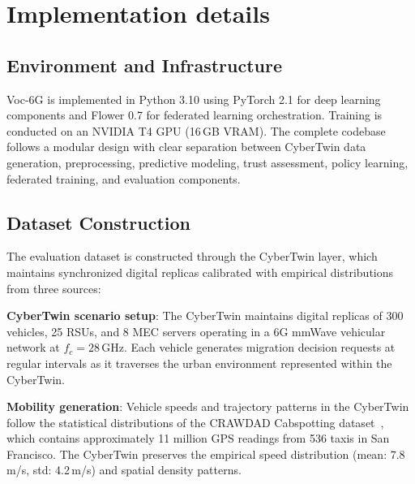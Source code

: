 \documentclass[10pt,letterpaper]{article}
\providecommand{\VocSixG}{Voc-6G}
\begin{document}
\section*{Implementation details}
\label{sec:implementation}

\subsection*{Environment and Infrastructure}

\VocSixG{} is implemented in Python 3.10 using PyTorch 2.1 for deep learning components and Flower 0.7 for federated learning orchestration. Training is conducted on an NVIDIA T4 GPU (16\,GB VRAM). The complete codebase follows a modular design with clear separation between CyberTwin data generation, preprocessing, predictive modeling, trust assessment, policy learning, federated training, and evaluation components.

\subsection*{Dataset Construction}

The evaluation dataset is constructed through the CyberTwin layer, which maintains synchronized digital replicas calibrated with empirical distributions from three sources:

\textbf{CyberTwin scenario setup}: The CyberTwin maintains digital replicas of 300 vehicles, 25 RSUs, and 8 MEC servers operating in a 6G mmWave vehicular network at $f_c = 28$\,GHz. Each vehicle generates migration decision requests at regular intervals as it traverses the urban environment represented within the CyberTwin.

\textbf{Mobility generation}: Vehicle speeds and trajectory patterns in the CyberTwin follow the statistical distributions of the CRAWDAD Cabspotting dataset~\cite{crawdad2009}, which contains approximately 11 million GPS readings from 536 taxis in San Francisco. The CyberTwin preserves the empirical speed distribution (mean: 7.8\,m/s, std: 4.2\,m/s) and spatial density patterns.
\end{document}
